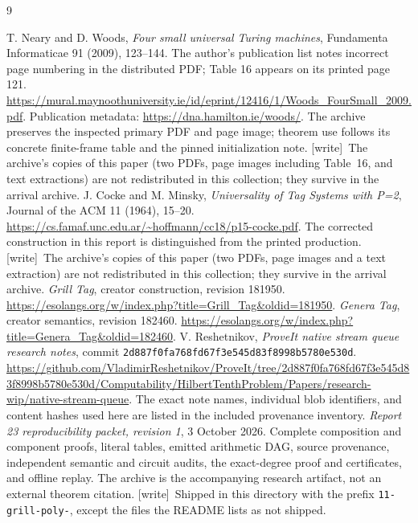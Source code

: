 \documentclass[11pt,letterpaper]{article}
\theoremstyle{definition}\newtheorem{definition}[theorem]{Definition}
\theoremstyle{remark}\newtheorem{remark}[theorem]{Remark}
\newcommand{\wtag}{\textup{[write]}}
\begin{document}
\renewcommand{\refname}{References of Report 23 revision 1}
\begin{thebibliography}{9}
\raggedright
{} T. Neary and D. Woods, \emph{Four small universal Turing machines}, Fundamenta Informaticae 91 (2009), 123--144. The author's publication list notes incorrect page numbering in the distributed PDF; Table 16 appears on its printed page 121. \url{https://mural.maynoothuniversity.ie/id/eprint/12416/1/Woods_FourSmall_2009.pdf}. Publication metadata: \url{https://dna.hamilton.ie/woods/}. The archive preserves the inspected primary PDF and page image; theorem use follows its concrete finite-frame table and the pinned initialization note. \wtag\ The archive's copies of this paper (two PDFs, page images including Table~16, and text extractions) are not redistributed in this collection; they survive in the arrival archive.
 J. Cocke and M. Minsky, \emph{Universality of Tag Systems with P=2}, Journal of the ACM 11 (1964), 15--20. \url{https://cs.famaf.unc.edu.ar/~hoffmann/cc18/p15-cocke.pdf}. The corrected construction in this report is distinguished from the printed production. \wtag\ The archive's copies of this paper (two PDFs, page images and a text extraction) are not redistributed in this collection; they survive in the arrival archive.
 \emph{Grill Tag}, creator construction, revision 181950. \url{https://esolangs.org/w/index.php?title=Grill_Tag&oldid=181950}.
 \emph{Genera Tag}, creator semantics, revision 182460. \url{https://esolangs.org/w/index.php?title=Genera_Tag&oldid=182460}.
 V. Reshetnikov, \emph{ProveIt native stream queue research notes}, commit \texttt{2d887f0fa768fd67f3e545d83f8998b5780e530d}. \url{https://github.com/VladimirReshetnikov/ProveIt/tree/2d887f0fa768fd67f3e545d83f8998b5780e530d/Computability/HilbertTenthProblem/Papers/research-wip/native-stream-queue}. The exact note names, individual blob identifiers, and content hashes used here are listed in the included provenance inventory.
 \emph{Report 23 reproducibility packet, revision 1}, 3 October 2026. Complete composition and component proofs, literal tables, emitted arithmetic DAG, source provenance, independent semantic and circuit audits, the exact-degree proof and certificates, and offline replay. The archive is the accompanying research artifact, not an external theorem citation. \wtag\ Shipped in this directory with the prefix \texttt{11-grill-poly-}, except the files the README lists as not shipped.
\end{thebibliography}
\end{document}
